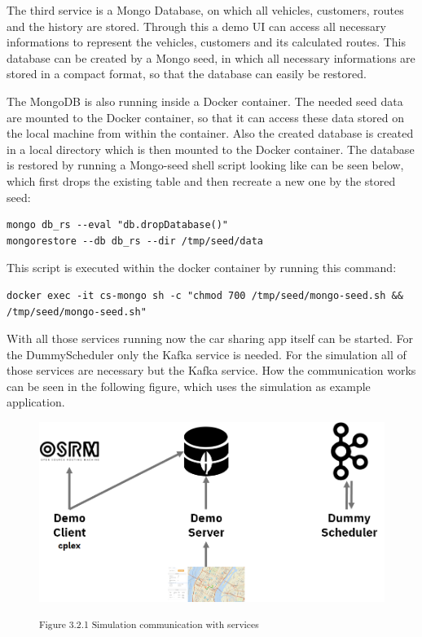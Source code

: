 The third service is a Mongo Database, on which all vehicles, customers, routes and the history are stored. Through this a demo UI can access all necessary informations to represent the vehicles, customers and its calculated routes. This database can be created by a Mongo seed, in which all necessary informations are stored in a compact format, so that the database can easily be restored. 

The MongoDB is also running inside a Docker container. The needed seed data are mounted to the Docker container, so that it can access these data stored on the local machine from within the container. Also the created database is created in a local directory which is then mounted to the Docker container. The database is restored by running a Mongo-seed shell script looking like can be seen below, which first drops the existing table and then recreate a new one by the stored seed:


\begin{lstlisting}
mongo db_rs --eval "db.dropDatabase()"
mongorestore --db db_rs --dir /tmp/seed/data
\end{lstlisting}

This script is executed within the docker container by running this command:

\begin{lstlisting}
docker exec -it cs-mongo sh -c "chmod 700 /tmp/seed/mongo-seed.sh && /tmp/seed/mongo-seed.sh"
\end{lstlisting}

With all those services running now the car sharing app itself can be started. For the DummyScheduler only the Kafka service is needed. For the simulation all of those services are necessary but the Kafka service. How the communication works can be seen in the following figure, which uses the simulation as example application.

\begin{figure}[h]
\centering
\includegraphics[width=\textwidth/5*4]{images/simulation_communication.png}

\textsuperscript{Figure 3.2.1 Simulation communication with services}\\
\end{figure}

